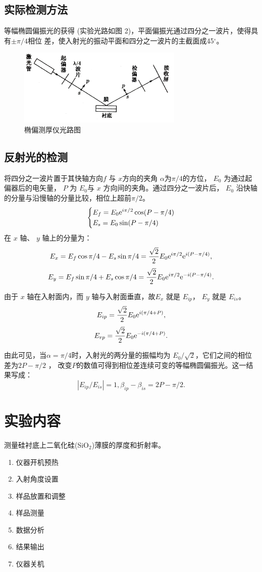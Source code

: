 \documentclass[a4paper]{article}
\begin{document}
\subsection{实际检测方法}
等幅椭圆偏振光的获得	(实验光路如图	2)，平面偏振光通过四分之一波片，使得具有$\pm\pi/4$相位 差，使入射光的振动平面和四分之一波片的主截面成45$^{\circ}$。
\begin{figure}[!h]
\centering
\includegraphics[width = 0.7\textwidth]{fig/2.png}
\caption{椭偏测厚仪光路图}
\end{figure}
\subsection{反射光的检测}
将四分之一波片置于其快轴方向$f$ 与 $x $方向的夹角 $\alpha$为$\pi/4$的方位， $E_0$ 为通过起偏器后的电矢量， $P$ 为 $E_0$与 $x$ 方向间的夹角。通过四分之一波片后，	$E_0$ 沿快轴的分量与沿慢轴的分量比较，相位上超前$\pi/2$。
$$\left\{\begin{aligned}&E_f=E_0{\rm e}^{i\pi/2}\cos(P-\pi/4)\\
&E_s=E_0\sin(P-\pi/4)\end{aligned}\right.$$
在 $x$ 轴、 $y$ 轴上的分量为：
$$E_x=E_f\cos\pi/4-E_s\sin\pi/4=\frac{\sqrt2}{2}E_0{\rm e}^{i\pi/2}{\rm e}^{i(P-\pi/4)},$$
$$E_y=E_f\sin\pi/4+E_s\cos\pi/4=\frac{\sqrt2}{2}E_0{\rm e}^{i\pi/2}{\rm e}^{-i(P-\pi/4)}.$$

由于 $x$ 轴在入射面内，而	$y$ 轴与入射面垂直，故$E_x$ 就是 $E_{ip}$， $E_y$ 就是 $E_{is}$。
$$E_{ip}=\frac{\sqrt2}{2}E_0{\rm e}^{i(\pi/4+P)},$$
$$E_{rp}=\frac{\sqrt2}{2}E_0{\rm e}^{-i(\pi/4+P)}.$$

由此可见，当$\alpha=\pi/4$时，入射光的两分量的振幅均为	$E_0/\sqrt2$，它们之间的相位差为$2P-\pi/2$	， 改变$P$的数值可得到相位差连续可变的等幅椭圆偏振光。这一结果写成：
$$|E_{ip}/E_{is}|=1,\beta_{ip}-\beta_{is}=2P-\pi/2.$$

\section{实验内容}
测量硅衬底上二氧化硅(SiO$_2$)薄膜的厚度和折射率。
\begin{enumerate}
\item 仪器开机预热
\item 入射角度设置
\item 样品放置和调整
\item 样品测量
\item 数据分析
\item 结果输出
\item 仪器关机
\end{enumerate}
\end{document}
